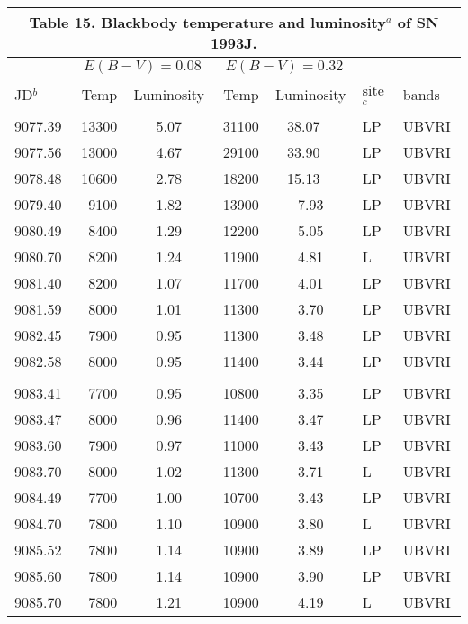 \begin{center}
\begin{tabular} {l r c r c l l}
\multicolumn{7}{c}{Table 15. Blackbody temperature and luminosity$^a$ of SN 1993J.} \\ \hline \hline
 & \multicolumn{2}{c}{$E(B-V)=0.08$} & \multicolumn{2}{c}{$E(B-V)=0.32$} \\
JD$^b$ & \hfil Temp \hfil  & \hfil Luminosity\hfil   & \hfil Temp \hfil  & \hfil Luminosity \hfil & \hfil  site$^c$ \hfil  & \hfil  bands \hfil \\ \hline
 9077.39  & 13300  &  5.07   &    31100  & 38.07\ \  & LP  &  UBVRI \\
 9077.56  & 13000  &  4.67   &    29100  & 33.90\ \  & LP  &  UBVRI \\
 9078.48  & 10600  &  2.78   &    18200  & 15.13\ \  & LP  &  UBVRI \\
 9079.40  &  9100  &  1.82   &    13900  &  7.93 & LP  &  UBVRI \\
 9080.49  &  8400  &  1.29   &    12200  &  5.05 & LP  &  UBVRI \\
 9080.70  &  8200  &  1.24   &    11900  &  4.81 & L &  UBVRI \\
 9081.40  &  8200  &  1.07   &    11700  &  4.01 & LP  &  UBVRI \\
 9081.59  &  8000  &  1.01   &    11300  &  3.70 & LP  &  UBVRI \\
 9082.45  &  7900  &  0.95   &    11300  &  3.48 & LP  &  UBVRI \\
 9082.58  &  8000  &  0.95   &    11400  &  3.44 & LP  &  UBVRI \\
  \\
 9083.41  &  7700  &  0.95   &    10800  &  3.35 & LP  &  UBVRI \\
 9083.47  &  8000  &  0.96   &    11400  &  3.47 & LP  &  UBVRI \\
 9083.60  &  7900  &  0.97   &    11000  &  3.43 & LP  &  UBVRI \\
 9083.70  &  8000  &  1.02   &    11300  &  3.71 & L &  UBVRI \\
 9084.49  &  7700  &  1.00   &    10700  &  3.43 & LP  &  UBVRI \\
 9084.70  &  7800  &  1.10   &    10900  &  3.80 & L &  UBVRI \\
 9085.52  &  7800  &  1.14   &    10900  &  3.89 & LP  &  UBVRI \\
 9085.60  &  7800  &  1.14   &    10900  &  3.90 & LP  &  UBVRI \\
 9085.70  &  7800  &  1.21   &    10900  &  4.19 & L &  UBVRI \\

\end{tabular}
\end{center}
